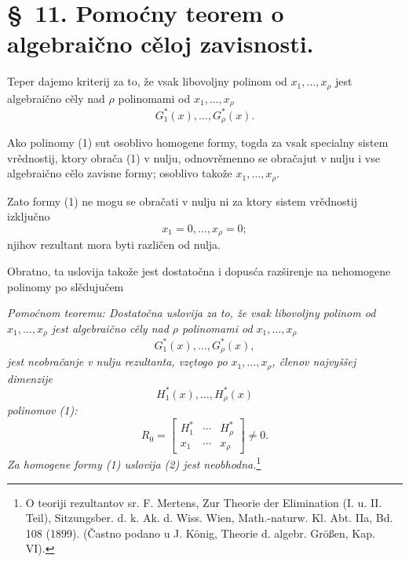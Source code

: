 \documentclass[11pt]{article}
\begin{document}
\section*{\S\ 11. Pomoćny teorem o algebraično cěloj zavisnosti.}

Teper dajemo kriterij za to, že vsak libovoljny polinom od $x_1,\ldots,x_\rho$ jest algebraično cěly nad $\rho$ polinomami od $x_1,\ldots,x_\rho$
\begin{equation}
  G_1^*(x),\ldots,G_\rho^*(x).
\tag{1}
\end{equation}

Ako polinomy (1) sut osoblivo homogene formy, togda za vsak specialny sistem vrědnostij, ktory obrača (1) v nulju, odnovrěmenno se obračajut v nulju i vse algebraično cělo zavisne formy; osoblivo takože $x_1,\ldots,x_\rho$.

Zato formy (1) ne mogu se obračati v nulju ni za ktory sistem vrědnostij izključno
\[
  x_1=0,\ldots,x_\rho=0;
\]
njihov rezultant mora byti različen od nulja.

Obratno, ta uslovija takože jest dostatočna i dopusća razširenje na nehomogene polinomy po slědujučem

{\itshape Pomoćnom teoremu: Dostatočna uslovija za to, že vsak libovoljny polinom od $x_1,\ldots,x_\rho$ jest algebraično cěly nad $\rho$ polinomami od $x_1,\ldots,x_\rho$}
\[
  G_1^*(x),\ldots,G_\rho^*(x),
\]
{\itshape jest neobračanje v nulju rezultanta, vzętogo po $x_1,\ldots,x_\rho$, členov najvyššej dimenzije}
\[
  H_1^*(x),\ldots,H_\rho^*(x)
\]
{\itshape polinomov (1):}
\begin{equation}
  R_0=\left[
  \begin{array}{ccc}
    H_1^*&\cdots&H_\rho^*\\
    x_1&\cdots&x_\rho
  \end{array}
  \right]\ne0.
\tag{2}
\end{equation}
{\itshape Za homogene formy (1) uslovija (2) jest neobhodna.}\footnote{O teoriji rezultantov sr. F. Mertens, Zur Theorie der Elimination (I. u. II. Teil), Sitzungsber. d. k. Ak. d. Wiss. Wien, Math.-naturw. Kl. Abt. IIa, Bd. 108 (1899). (Častno podano u J. König, Theorie d. algebr. Größen, Kap. VI).}
\end{document}
